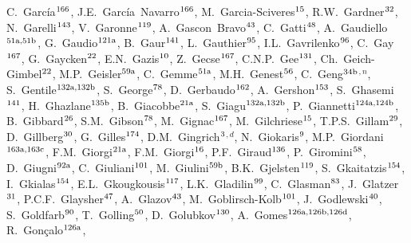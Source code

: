 \begin{flushleft}
C.~Garc\'ia$^\textrm{\scriptsize 166}$,
J.E.~Garc\'ia~Navarro$^\textrm{\scriptsize 166}$,
M.~Garcia-Sciveres$^\textrm{\scriptsize 15}$,
R.W.~Gardner$^\textrm{\scriptsize 32}$,
N.~Garelli$^\textrm{\scriptsize 143}$,
V.~Garonne$^\textrm{\scriptsize 119}$,
A.~Gascon~Bravo$^\textrm{\scriptsize 43}$,
C.~Gatti$^\textrm{\scriptsize 48}$,
A.~Gaudiello$^\textrm{\scriptsize 51a,51b}$,
G.~Gaudio$^\textrm{\scriptsize 121a}$,
B.~Gaur$^\textrm{\scriptsize 141}$,
L.~Gauthier$^\textrm{\scriptsize 95}$,
I.L.~Gavrilenko$^\textrm{\scriptsize 96}$,
C.~Gay$^\textrm{\scriptsize 167}$,
G.~Gaycken$^\textrm{\scriptsize 22}$,
E.N.~Gazis$^\textrm{\scriptsize 10}$,
Z.~Gecse$^\textrm{\scriptsize 167}$,
C.N.P.~Gee$^\textrm{\scriptsize 131}$,
Ch.~Geich-Gimbel$^\textrm{\scriptsize 22}$,
M.P.~Geisler$^\textrm{\scriptsize 59a}$,
C.~Gemme$^\textrm{\scriptsize 51a}$,
M.H.~Genest$^\textrm{\scriptsize 56}$,
C.~Geng$^\textrm{\scriptsize 34b}$$^{,n}$,
S.~Gentile$^\textrm{\scriptsize 132a,132b}$,
S.~George$^\textrm{\scriptsize 78}$,
D.~Gerbaudo$^\textrm{\scriptsize 162}$,
A.~Gershon$^\textrm{\scriptsize 153}$,
S.~Ghasemi$^\textrm{\scriptsize 141}$,
H.~Ghazlane$^\textrm{\scriptsize 135b}$,
B.~Giacobbe$^\textrm{\scriptsize 21a}$,
S.~Giagu$^\textrm{\scriptsize 132a,132b}$,
P.~Giannetti$^\textrm{\scriptsize 124a,124b}$,
B.~Gibbard$^\textrm{\scriptsize 26}$,
S.M.~Gibson$^\textrm{\scriptsize 78}$,
M.~Gignac$^\textrm{\scriptsize 167}$,
M.~Gilchriese$^\textrm{\scriptsize 15}$,
T.P.S.~Gillam$^\textrm{\scriptsize 29}$,
D.~Gillberg$^\textrm{\scriptsize 30}$,
G.~Gilles$^\textrm{\scriptsize 174}$,
D.M.~Gingrich$^\textrm{\scriptsize 3}$$^{,d}$,
N.~Giokaris$^\textrm{\scriptsize 9}$,
M.P.~Giordani$^\textrm{\scriptsize 163a,163c}$,
F.M.~Giorgi$^\textrm{\scriptsize 21a}$,
F.M.~Giorgi$^\textrm{\scriptsize 16}$,
P.F.~Giraud$^\textrm{\scriptsize 136}$,
P.~Giromini$^\textrm{\scriptsize 58}$,
D.~Giugni$^\textrm{\scriptsize 92a}$,
C.~Giuliani$^\textrm{\scriptsize 101}$,
M.~Giulini$^\textrm{\scriptsize 59b}$,
B.K.~Gjelsten$^\textrm{\scriptsize 119}$,
S.~Gkaitatzis$^\textrm{\scriptsize 154}$,
I.~Gkialas$^\textrm{\scriptsize 154}$,
E.L.~Gkougkousis$^\textrm{\scriptsize 117}$,
L.K.~Gladilin$^\textrm{\scriptsize 99}$,
C.~Glasman$^\textrm{\scriptsize 83}$,
J.~Glatzer$^\textrm{\scriptsize 31}$,
P.C.F.~Glaysher$^\textrm{\scriptsize 47}$,
A.~Glazov$^\textrm{\scriptsize 43}$,
M.~Goblirsch-Kolb$^\textrm{\scriptsize 101}$,
J.~Godlewski$^\textrm{\scriptsize 40}$,
S.~Goldfarb$^\textrm{\scriptsize 90}$,
T.~Golling$^\textrm{\scriptsize 50}$,
D.~Golubkov$^\textrm{\scriptsize 130}$,
A.~Gomes$^\textrm{\scriptsize 126a,126b,126d}$,
R.~Gon\c{c}alo$^\textrm{\scriptsize 126a}$,

\end{flushleft}
